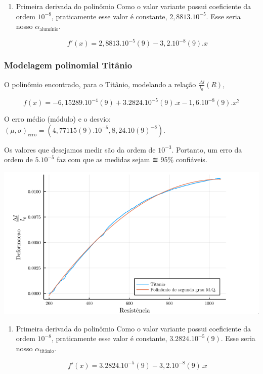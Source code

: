\documentclass[11pt]{article}
\begin{document}
\begin{enumerate}
\item Primeira derivada do polinômio
\label{sec:org3989916}
Como o valor variante possui coeficiente da ordem \(10^{-8}\), praticamente esse valor é constante, \(2,8813.10^{-5}\). Esse seria nosso \(\alpha_{\textrm{alumínio}}\).

\begin{equation}
f'(x)=2,8813.10^{-5}(9) - 3,2.10^{-8}(9).x
\end{equation}
\end{enumerate}

\subsubsection{Modelagem polinomial Titânio}
\label{sec:org15a3677}
O polinômio encontrado, para o Titânio, modelando a relação \(\frac{\Delta l}{l_0}(R)\),

\begin{equation}
f(x)=-6,15289.10^{-4}(9) + 3.2824.10^{-5}(9).x - 1,6.10^{-8}(9).x^2
\end{equation}

O erro médio (módulo) e o desvio: \((\mu, \sigma)_{\textrm{erro}} = (4,77115(9).10^{-5}, 8,24.10(9)^{-8})\).

Os valores que desejamos medir são da ordem de \(10^{-3}\). Portanto, um erro da ordem de \(5.10^{-5}\) faz com que as medidas sejam ≅ 95\% confiáveis.

\href{img/polinomio-aluminio203.png}{\includegraphics[width=.9\linewidth]{./img/polinomio-titanio.png}}

\begin{enumerate}
\item Primeira derivada do polinômio
\label{sec:org8cf46bd}
Como o valor variante possui coeficiente da ordem \(10^{-8}\), praticamente esse valor é constante, \(3.2824.10^{-5}(9)\). Esse seria nosso \(\alpha_{\textrm{titânio}}\).

\begin{equation}
f'(x)=3.2824.10^{-5}(9) - 3,2.10^{-8}(9).x
\end{equation}
\end{enumerate}
\end{document}
